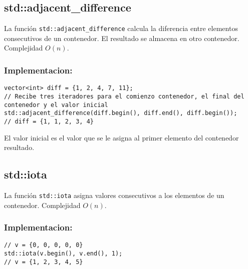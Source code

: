 \subsection{std::adjacent\_difference}
\label{subsec:std_adjacent_difference}
La función \texttt{std::adjacent\_difference} calcula la diferencia entre elementos consecutivos de un contenedor. El resultado se almacena en otro contenedor. Complejidad $O(n)$.

\subsubsection{Implementacion:}
\begin{lstlisting}
vector<int> diff = {1, 2, 4, 7, 11};
// Recibe tres iteradores para el comienzo contenedor, el final del contenedor y el valor inicial
std::adjacent_difference(diff.begin(), diff.end(), diff.begin());
// diff = {1, 1, 2, 3, 4}
\end{lstlisting}

El valor inicial es el valor que se le asigna al primer elemento del contenedor resultado.

\subsection{std::iota}
\label{subsec:std_iota}
La función \texttt{std::iota} asigna valores consecutivos a los elementos de un contenedor. Complejidad $O(n)$. 

\subsubsection{Implementacion:}
\begin{lstlisting}
// v = {0, 0, 0, 0, 0}
std::iota(v.begin(), v.end(), 1);
// v = {1, 2, 3, 4, 5}
\end{lstlisting}
